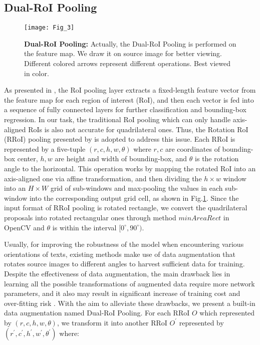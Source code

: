 \documentclass[3p, times]{elsarticle}
\begin{document}
\subsection{Dual-RoI Pooling}

\begin{figure}[!htb]
\centering
\texttt{[image: Fig\_3]}
\caption{\textbf{Dual-RoI Pooling:} Actually, the Dual-RoI Pooling is performed on the feature map. We draw it on source image for better viewing. Different colored arrows represent different operations. Best viewed in color.}
\label{Fig_3}
\end{figure}

As presented in \cite{FASTRCNN2015ICCV}, the RoI pooling layer extracts a fixed-length feature vector from the feature map for each region of interest (RoI), and then each vector is fed into a sequence of fully connected layers for further classification and bounding-box regression. In our task, the traditional RoI pooling which can only handle axis-aligned RoIs is also not accurate for quadrilateral ones. Thus, the Rotation RoI (RRoI) pooling presented by \cite{RRPN2017ARXIV} is adopted to address this issue. Each RRoI is represented by a five-tuple $(r,c,h,w,\theta)$ where $r,c$ are coordinates of bounding-box center, $h,w$ are height and width of bounding-box, and $\theta$ is the rotation angle to the horizontal. This operation works by mapping the rotated RoI into an axis-aligned one via affine transformation, and then dividing the $h\times{w}$ window into an $H\times{W}$ grid of sub-windows and max-pooling the values in each sub-window into the corresponding output grid cell, as shown in Fig.\ref{Fig_3}. Since the input format of RRoI pooling is rotated rectangle, we convert the quadrilateral proposals into rotated rectangular ones through method $minAreaRect$ in OpenCV and $\theta$ is within the interval $[0^{\circ}, 90^{\circ})$.

Usually, for improving the robustness of the model when encountering various orientations of texts, existing methods \cite{DDR2017ICCV, FTSN2017ARXIV, RRCNN2017ARXIV} make use of data augmentation that rotates source images to different angles to harvest sufficient data for training. Despite the effectiveness of data augmentation, the main drawback lies in learning all the possible transformations of augmented data require more network parameters, and it also may result in significant increase of training cost and over-fitting risk \cite{ORN2017CVPR}. With the aim to alleviate these drawbacks, we present a built-in data augmentation named Dual-RoI Pooling. For each RRoI $O$ which represented by $(r,c,h,w,\theta)$, we transform it into another RRoI $O^{'}$ represented by $(r^{'},c^{'},h^{'},w^{'},\theta^{'})$ where:
\end{document}
